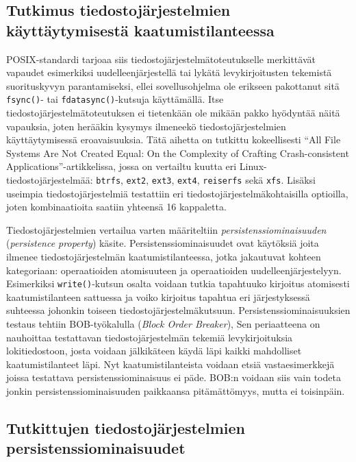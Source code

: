 \subsection{Tutkimus tiedostojärjestelmien käyttäytymisestä kaatumistilanteessa}
POSIX-standardi tarjoaa siis tiedostojärjestelmätoteutukselle merkittävät vapaudet esimerkiksi uudelleenjärjestellä tai lykätä levykirjoitusten tekemistä suorituskyvyn parantamiseksi,
ellei sovellusohjelma ole erikseen pakottanut sitä \texttt{fsync()}- tai \texttt{fdatasync()}-kutsuja käyttämällä.
Itse tiedostojärjestelmätoteutuksen ei tietenkään ole mikään pakko hyödyntää näitä vapauksia,
joten herääkin kysymys ilmeneekö tiedostojärjestelmien käyttäytymisessä eroavaisuuksia.
Tätä aihetta on tutkittu kokeellisesti ``All File Systems Are Not Created Equal: On the Complexity of Crafting Crash-consistent Applications''\cite{PosixDataConsistency}-artikkelissa,
jossa on vertailtu kuutta eri Linux-tiedostojärjestelmää: \texttt{btrfs}, \texttt{ext2}, \texttt{ext3}, \texttt{ext4}, \texttt{reiserfs} sekä \texttt{xfs}.
Lisäksi useimpia tiedostojärjestelmiä testattiin eri tiedostojärjestelmäkohtaisilla optioilla,
joten kombinaatioita saatiin yhteensä 16 kappaletta.

Tiedostojärjestelmien vertailua varten määriteltiin \emph{persistenssiominaisuuden} (\emph{persistence property}) käsite.
Persistenssiominaisuudet ovat käytöksiä joita ilmenee tiedostojärjestelmän kaatumistilanteessa,
jotka jakautuvat kohteen kategoriaan: operaatioiden atomisuuteen ja operaatioiden uudelleenjärjestelyyn.
Esimerkiksi \texttt{write()}-kutsun osalta voidaan tutkia tapahtuuko kirjoitus atomisesti kaatumistilanteen sattuessa ja voiko kirjoitus tapahtua eri järjestyksessä suhteessa johonkin toiseen tiedostojärjestelmäkutsuun.
Persistenssiominaisuuksien testaus tehtiin BOB-työkalulla (\emph{Block Order Breaker}),
Sen periaatteena on nauhoittaa testattavan tiedostojärjestelmän tekemiä levykirjoituksia lokitiedostoon,
josta voidaan jälkikäteen käydä läpi kaikki mahdolliset kaatumistilanteet läpi.
Nyt kaatumistilanteista voidaan etsiä vastaesimerkkejä joissa testattava persistenssiominaisuus ei päde.
BOB:n voidaan siis vain todeta jonkin persistenssiominaisuuden paikkaansa pitämättömyys, mutta ei toisinpäin.

\subsection{Tutkittujen tiedostojärjestelmien persistenssiominaisuudet}
\newcommand{\atY}{$\bullet$}
\newcommand{\atN}{{\small $\times$}}

